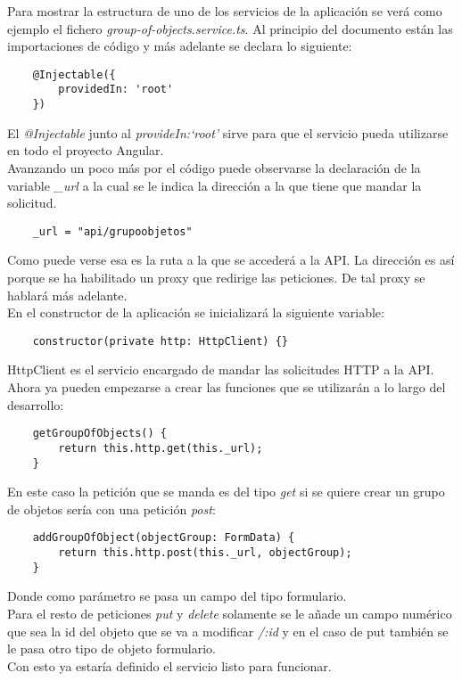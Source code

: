 Para mostrar la estructura de uno de los servicios de la aplicación se verá como ejemplo el fichero \textit{group-of-objects.service.ts}. Al principio del documento están las importaciones de código y más adelante se declara lo siguiente:
\begin{verbatim}
    @Injectable({
        providedIn: 'root'
    })
\end{verbatim}
El \textit{@Injectable} junto al \textit{provideIn:`root'} sirve para que el servicio pueda utilizarse en todo el proyecto Angular.
\\Avanzando un poco más por el código puede observarse la declaración de la variable \textit{\_url} a la cual se le indica la dirección a la que tiene que mandar la solicitud.
\begin{verbatim}
    _url = "api/grupoobjetos"
\end{verbatim}
Como puede verse esa es la ruta a la que se accederá a la API. La dirección es así porque se ha habilitado un proxy que redirige las peticiones. De tal proxy se hablará más adelante.
\\En el constructor de la aplicación se inicializará la siguiente variable:
\begin{verbatim}
    constructor(private http: HttpClient) {}
\end{verbatim}
HttpClient es el servicio encargado de mandar las solicitudes HTTP a la API.
\\Ahora ya pueden empezarse a crear las funciones que se utilizarán a lo largo del desarrollo:
\begin{verbatim}
    getGroupOfObjects() {
        return this.http.get(this._url);
    }
\end{verbatim}
En este caso la petición que se manda es del tipo \textit{get} si se quiere crear un grupo de objetos sería con una petición \textit{post}:
\begin{verbatim}
    addGroupOfObject(objectGroup: FormData) {
        return this.http.post(this._url, objectGroup);
    }
\end{verbatim}
Donde como parámetro se pasa un campo del tipo formulario.
\\Para el resto de peticiones \textit{put} y \textit{delete} solamente se le añade un campo numérico que sea la id del objeto que se va a modificar \textit{/:id} y en el caso de put también se le pasa otro tipo de objeto formulario.
\\Con esto ya estaría definido el servicio listo para funcionar.